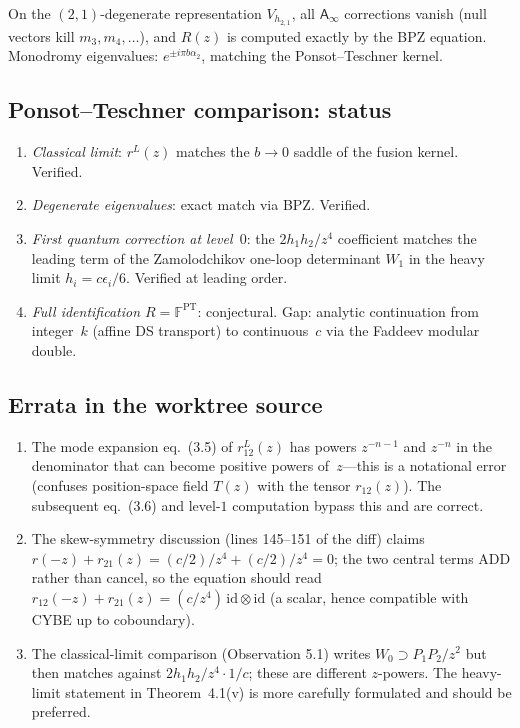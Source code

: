 \documentclass[11pt]{article}
\newcommand{\Ainf}{\mathsf{A}_{\infty}}
\newcommand{\id}{\mathrm{id}}
\begin{document}
On the $(2,1)$-degenerate representation $V_{h_{2,1}}$, all $\Ainf$
corrections vanish (null vectors kill $m_3, m_4, \ldots$), and $R(z)$
is computed exactly by the BPZ equation.  Monodromy eigenvalues:
$e^{\pm i\pi b\alpha_2}$, matching the Ponsot--Teschner kernel.

\subsection*{Ponsot--Teschner comparison: status}

\begin{enumerate}[label=(\arabic*)]
\item \emph{Classical limit}: $r^L(z)$ matches the $b \to 0$ saddle
  of the fusion kernel.  Verified.
\item \emph{Degenerate eigenvalues}: exact match via BPZ.  Verified.
\item \emph{First quantum correction at level~$0$}: the $2h_1 h_2/z^4$
  coefficient matches the leading term of the Zamolodchikov one-loop
  determinant $W_1$ in the heavy limit $h_i = c\epsilon_i/6$.
  Verified at leading order.
\item \emph{Full identification $R = \mathbb{F}^{\mathrm{PT}}$}:
  conjectural.  Gap: analytic continuation from integer~$k$ (affine
  DS transport) to continuous~$c$ via the Faddeev modular double.
\end{enumerate}

\subsection*{Errata in the worktree source}

\begin{enumerate}[label=(E\arabic*)]
\item The mode expansion eq.~(3.5) of $r^L_{12}(z)$ has powers
  $z^{-n-1}$ and $z^{-n}$ in the denominator that can become
  positive powers of~$z$---this is a notational error (confuses
  position-space field $T(z)$ with the tensor $r_{12}(z)$).  The
  subsequent eq.~(3.6) and level-$1$ computation bypass this and
  are correct.
\item The skew-symmetry discussion (lines 145--151 of the diff)
  claims $r(-z) + r_{21}(z) = (c/2)/z^4 + (c/2)/z^4 = 0$; the
  two central terms ADD rather than cancel, so the equation should
  read $r_{12}(-z) + r_{21}(z) = (c/z^4)\,\id \otimes \id$ (a
  scalar, hence compatible with CYBE up to coboundary).
\item The classical-limit comparison (Observation 5.1) writes
  $W_0 \supset P_1 P_2/z^2$ but then matches against $2h_1 h_2/z^4
  \cdot 1/c$; these are different $z$-powers.  The heavy-limit
  statement in Theorem~4.1(v) is more carefully formulated and
  should be preferred.
\end{enumerate}
\end{document}
